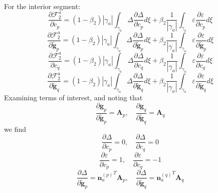 \documentclass[11pt]{article} %
\begin{document}
For the interior segment:
\begin{equation}
	\frac{\partial \mathcal{F}^a_2}{\partial c_p} = (1-\beta_2) | \gamma_a | \int_{\gamma_a} \Delta \frac{\partial \Delta}{\partial c_p} d \xi + \beta_2 \frac{1}{| \gamma_a |} \int_{\gamma_a} \varepsilon \frac{\partial \varepsilon}{\partial c_p} d \xi
\end{equation}
\begin{equation}
	\frac{\partial \mathcal{F}^a_2}{\partial \tilde{\mathbf{g}}_p} = (1-\beta_2) | \gamma_a | \int_{\gamma_a} \Delta \frac{\partial \Delta}{\partial \tilde{\mathbf{g}}_p} d \xi + \beta_2 \frac{1}{| \gamma_a |} \int_{\gamma_a} \varepsilon \frac{\partial \varepsilon}{\partial \tilde{\mathbf{g}}_p} d \xi
\end{equation}
\begin{equation}
	\frac{\partial \mathcal{F}^a_2}{\partial c_q} = (1-\beta_2) | \gamma_a | \int_{\gamma_a} \Delta \frac{\partial \Delta}{\partial c_q} d \xi + \beta_2 \frac{1}{| \gamma_a |} \int_{\gamma_a} \varepsilon \frac{\partial \varepsilon}{\partial c_q} d \xi
\end{equation}
\begin{equation}
	\frac{\partial \mathcal{F}^a_2}{\partial \tilde{\mathbf{g}}_q} = (1-\beta_2) | \gamma_a | \int_{\gamma_a} \Delta \frac{\partial \Delta}{\partial \tilde{\mathbf{g}}_q} d \xi + \beta_2 \frac{1}{| \gamma_a |} \int_{\gamma_a} \varepsilon \frac{\partial \varepsilon}{\partial \tilde{\mathbf{g}}_q} d \xi
\end{equation}
Examining terms of interest, and noting that
\begin{equation}
	\frac{\partial \mathbf{g}_p}{\partial \tilde{\mathbf{g}}_p} = \mathbf{A}_p, \quad \frac{\partial \mathbf{g}_q}{\partial \tilde{\mathbf{g}}_q} = \mathbf{A}_q
\end{equation}
we find
\begin{equation}
	\frac{\partial \Delta}{\partial c_p} = 0, \quad \frac{\partial \Delta}{\partial c_q} = 0
\end{equation}
\begin{equation}
	\frac{\partial \varepsilon}{\partial c_p} = 1, \quad \frac{\partial \varepsilon}{\partial c_q} = -1
\end{equation}
\begin{equation}
	\frac{\partial \Delta}{\partial \tilde{\mathbf{g}}_p} = {\mathbf{n}_a^{(p)}}^T \mathbf{A}_p, \quad \frac{\partial \Delta}{\partial \tilde{\mathbf{g}}_q} = {\mathbf{n}_a^{(q)}}^T \mathbf{A}_q
\end{equation}
\end{document}
